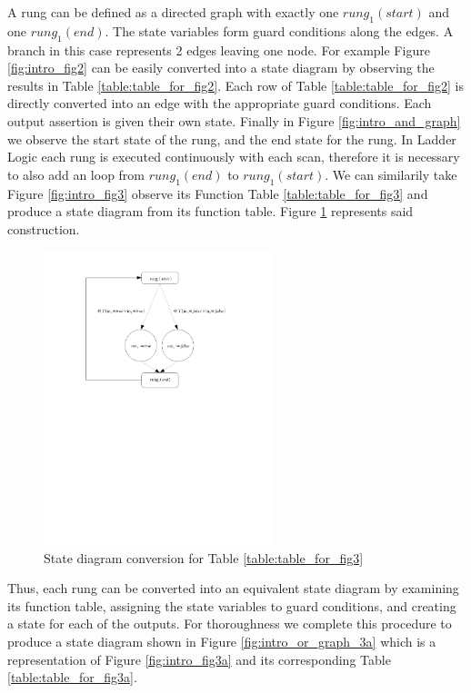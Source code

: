 A rung can be defined as a directed graph with exactly one $rung_1(start)$ and one $rung_1(end)$. The state variables form guard conditions along the edges. A branch in this case represents 2 edges leaving one node. For example Figure \ref{fig:intro_fig2}
can be easily converted into a state diagram by observing the results in Table \ref{table:table_for_fig2}. 
Each row of Table \ref{table:table_for_fig2} is directly converted into an edge with the appropriate guard conditions.
Each output assertion is given their own state. Finally in Figure \ref{fig:intro_and_graph} we observe the start state of the rung, and the end state for the rung. In Ladder Logic each rung is executed continuously with each scan, therefore it is necessary to also add an loop from $rung_1(end)$ to $rung_1(start)$. We can similarily take Figure \ref{fig:intro_fig3} observe its Function Table \ref{table:table_for_fig3} and produce a state diagram from its function table. Figure \ref{fig:intro_or_graph} represents said construction.


\begin{figure}[h]
    \centering
    \includegraphics[trim= 00mm 140mm 40mm 10mm, clip, width=250px]{./images/intro_or_graph.pdf} %
    \caption{State diagram conversion for Table \ref{table:table_for_fig3}}
    \label{fig:intro_or_graph}
\end{figure}

Thus, each rung can be converted into an equivalent state diagram by examining its 
function table, assigning the state variables to guard conditions, and creating a
state for each of the outputs. For thoroughness we complete this procedure to produce
a state diagram shown in Figure \ref{fig:intro_or_graph_3a} which is a representation of 
Figure \ref{fig:intro_fig3a} and its
corresponding Table \ref{table:table_for_fig3a}.


